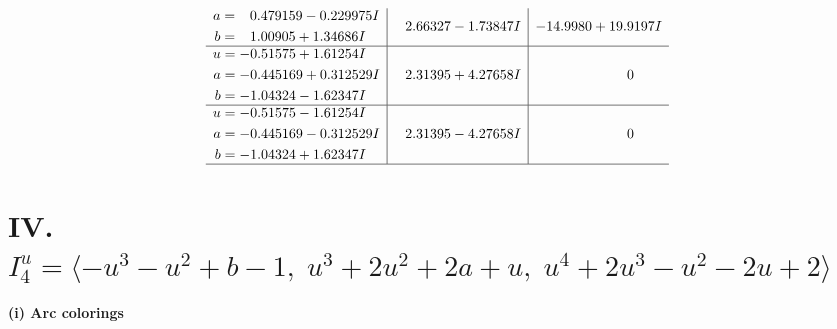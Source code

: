 \documentclass[1p]{elsarticle_modified}
\theoremstyle{definition}
\begin{document}
$$\begin{array}{c|c|c}
\begin{aligned}
a &= \phantom{-}0.479159 - 0.229975 I \\
b &= \phantom{-}1.00905 + 1.34686 I\end{aligned}
 & \phantom{-}2.66327 - 1.73847 I & -14.9980 + 19.9197 I \\ \hline\begin{aligned}
u &= -0.51575 + 1.61254 I \\
a &= -0.445169 + 0.312529 I \\
b &= -1.04324 - 1.62347 I\end{aligned}
 & \phantom{-}2.31395 + 4.27658 I & \phantom{-0.000000 } 0 \\ \hline\begin{aligned}
u &= -0.51575 - 1.61254 I \\
a &= -0.445169 - 0.312529 I \\
b &= -1.04324 + 1.62347 I\end{aligned}
 & \phantom{-}2.31395 - 4.27658 I & \phantom{-0.000000 } 0\\
 \hline 
 \end{array}$$\newpage\newpage\renewcommand{\arraystretch}{1}
\centering \section*{IV. $I^u_{4}= \langle - u^3- u^2+b-1,\;u^3+2 u^2+2 a+u,\;u^4+2 u^3- u^2-2 u+2 \rangle$}
\flushleft \textbf{(i) Arc colorings}\\
\end{document}

